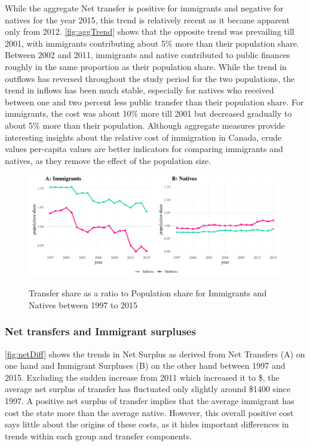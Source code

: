   While the aggregate Net transfer is positive for immigrants and negative for natives for the year 2015, this trend is relatively recent as it became apparent only from 2012.
\autoref{fig:aggTrend} shows that the opposite trend was prevailing till 2001, with immigrants contributing about 5\% more than their population share.
Between 2002 and 2011, immigrants and native contributed to public finances roughly in the same proportion as their population share.
While the trend in outflows has reversed throughout the study period for the two populations, the trend in inflows has been much stable, especially for natives who received between one and two percent less public transfer than their population share.
For immigrants, the cost was about 10\% more till 2001 but decreased gradually to about 5\% more than their population.
Although aggregate measures provide interesting insights about the relative cost of immigration in Canada, crude values per-capita values are better indicators for comparing immigrants and natives, as they remove the effect of the population size.

  \begin{figure}[H]%
    \caption{Transfer share as a ratio to Population share for Immigrants and Natives between 1997 to 2015}
    \includegraphics[width=1\textwidth]{res/aggTrend.pdf}%
    \label{fig:aggTrend}%
  \end{figure}%

  \subsubsection*{Net transfers and Immigrant surpluses}

\autoref{fig:netDiff} shows the trends in Net Surplus as derived from Net Transfers (A) on one hand and Immigrant Surpluses (B) on the other hand between 1997 and 2015.
Excluding the sudden increase from 2011 which increased it to \$, the average net surplus of transfer has fluctuated only slightly around \$1400 since 1997.
A positive net surplus of transfer implies that the average immigrant has cost the state more than the average native.
However, this overall positive cost says little about the origins of these costs, as it hides important differences in trends within each group and transfer components.

